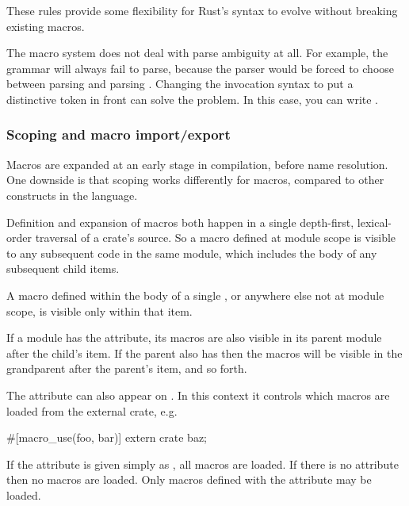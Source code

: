 These rules provide some flexibility for Rust's syntax to evolve without breaking existing macros.

\blank

The macro system does not deal with parse ambiguity at all. For example, the grammar  will always fail to 
parse, because the parser would be forced to choose between parsing  and parsing . Changing the invocation syntax to 
put a distinctive token in front can solve the problem. In this case, you can write .

\subsubsection*{Scoping and macro import/export}

Macros are expanded at an early stage in compilation, before name resolution. One downside is that scoping works differently for 
macros, compared to other constructs in the language.

\blank

Definition and expansion of macros both happen in a single depth-first, lexical-order traversal of a crate's source. So a macro 
defined at module scope is visible to any subsequent code in the same module, which includes the body of any subsequent child  items.

\blank

A macro defined within the body of a single , or anywhere else not at module scope, is visible only within that item.

\blank

If a module has the  attribute, its macros are also visible in its parent module after the child's  item. If 
the parent also has  then the macros will be visible in the grandparent after the parent's  item, and so forth.

\blank

The  attribute can also appear on . In this context it controls which macros are loaded from the external 
crate, e.g.

\begin{rustc}
#[macro_use(foo, bar)]
extern crate baz;
\end{rustc}

If the attribute is given simply as , all macros are loaded. If there is no  attribute then no 
macros are loaded. Only macros defined with the  attribute may be loaded.

